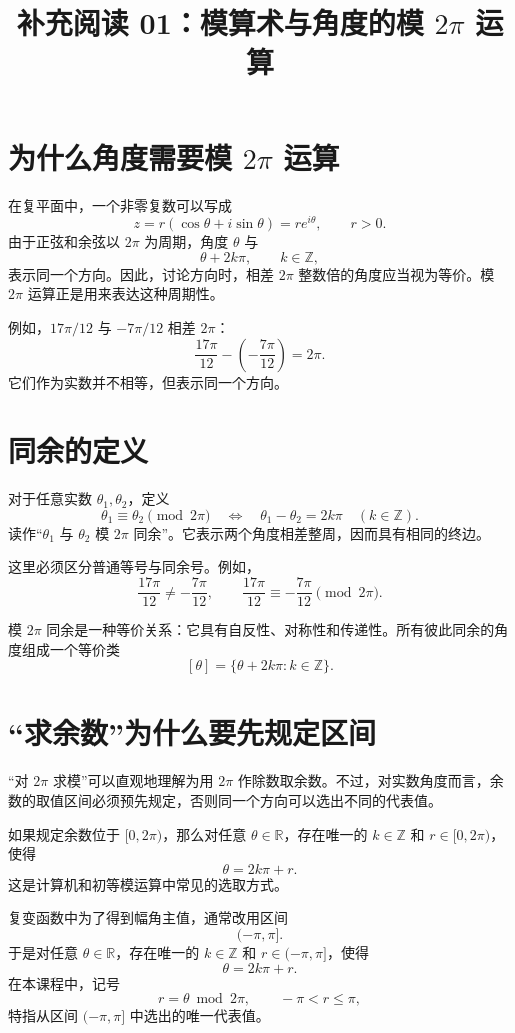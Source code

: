 \documentclass[UTF8,11pt]{ctexart}
\title{\textcolor{courseblue}{补充阅读 01：模算术与角度的模 $2\pi$ 运算}}
\author{}
\date{}
\newcommand{\Z}{\mathbb{Z}}
\begin{document}
\maketitle
\vspace{-2.2em}

\section{为什么角度需要模 $2\pi$ 运算}

在复平面中，一个非零复数可以写成
\[
z=r(\cos\theta+i\sin\theta)=re^{i\theta},\qquad r>0.
\]
由于正弦和余弦以 $2\pi$ 为周期，角度 $\theta$ 与
\[
\theta+2k\pi,\qquad k\in\Z,
\]
表示同一个方向。因此，讨论方向时，相差 $2\pi$ 整数倍的角度应当视为等价。模 $2\pi$ 运算正是用来表达这种周期性。

例如，$17\pi/12$ 与 $-7\pi/12$ 相差 $2\pi$：
\[
\frac{17\pi}{12}-\left(-\frac{7\pi}{12}\right)=2\pi.
\]
它们作为实数并不相等，但表示同一个方向。

\section{同余的定义}

对于任意实数 $\theta_1,\theta_2$，定义
\[
\theta_1\equiv\theta_2\pmod{2\pi}
\quad\Longleftrightarrow\quad
\theta_1-\theta_2=2k\pi\quad(k\in\Z).
\]
读作“$\theta_1$ 与 $\theta_2$ 模 $2\pi$ 同余”。它表示两个角度相差整周，因而具有相同的终边。

这里必须区分普通等号与同余号。例如，
\[
\frac{17\pi}{12}\ne-\frac{7\pi}{12},
\qquad
\frac{17\pi}{12}\equiv-\frac{7\pi}{12}\pmod{2\pi}.
\]

模 $2\pi$ 同余是一种等价关系：它具有自反性、对称性和传递性。所有彼此同余的角度组成一个等价类
\[
[\theta]=\{\theta+2k\pi:k\in\Z\}.
\]

\section{“求余数”为什么要先规定区间}

“对 $2\pi$ 求模”可以直观地理解为用 $2\pi$ 作除数取余数。不过，对实数角度而言，余数的取值区间必须预先规定，否则同一个方向可以选出不同的代表值。

如果规定余数位于 $[0,2\pi)$，那么对任意 $\theta\in\mathbb{R}$，存在唯一的 $k\in\Z$ 和 $r\in[0,2\pi)$，使得
\[
\theta=2k\pi+r.
\]
这是计算机和初等模运算中常见的选取方式。

复变函数中为了得到幅角主值，通常改用区间
\[
(-\pi,\pi].
\]
于是对任意 $\theta\in\mathbb{R}$，存在唯一的 $k\in\Z$ 和 $r\in(-\pi,\pi]$，使得
\[
\theta=2k\pi+r.
\]
在本课程中，记号
\[
r=\theta\bmod 2\pi,
\qquad -\pi<r\leq\pi,
\]
特指从区间 $(-\pi,\pi]$ 中选出的唯一代表值。
\end{document}
